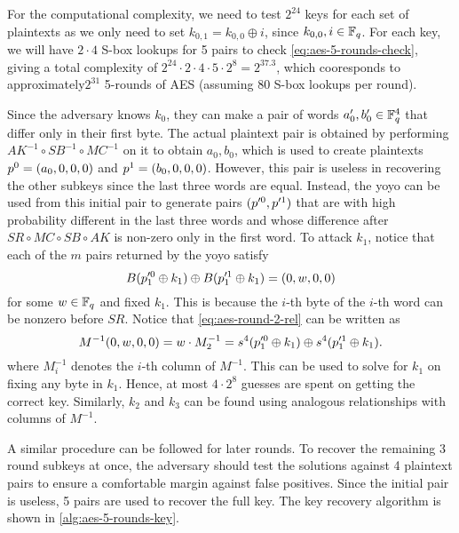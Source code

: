 \documentclass[twoside]{article}
\begin{document}
For the computational complexity, we need to test \(2^{24}\) keys for each set
of plaintexts as we only need to set \(k_{0, 1} = k_{0, 0} \oplus i\), since
\(k_{0, 0}, i \in \mathbb F_q\). For each key, we will have \(2 \cdot 4\) S-box
lookups for 5 pairs to check \eqref{eq:aes-5-rounds-check}, giving a total
complexity of \(2^{24} \cdot 2 \cdot 4 \cdot 5 \cdot 2^8 = 2^{37.3}\), which
cooresponds to approximately\(2^{31}\) 5-rounds of AES (assuming 80 S-box
lookups per round).

Since the adversary knows \(k_0\), they can make a pair of words \(a_0^\prime,
b_0^\prime \in \mathbb F_q^4\) that differ only in their first byte. The actual
plaintext pair is obtained by performing \(AK^{-1} \circ SB^{-1} \circ MC^{-1}\)
on it to obtain \(a_0, b_0\), which is used to create plaintexts \(p^0 =
(a_0, 0, 0, 0)\) and \(p^1 = (b_0, 0, 0, 0)\). However, this pair is
useless in recovering the other subkeys since the last three words are equal.
Instead, the yoyo can be used from this initial pair to generate pairs
\((p^{\prime 0}, p^{\prime 1})\) that are with high probability different
in the last three words and whose difference after \(SR \circ MC \circ SB \circ
AK\) is non-zero only in the first word. To attack \(k_1\), notice that each of
the \(m\) pairs returned by the yoyo satisfy
\begin{equation}
    B(p_1^{\prime 0} \oplus k_1) \oplus B(p_1^{\prime 1} \oplus k_1) = (0, w, 0, 0)
    \label{eq:aes-round-2-rel}
\end{equation}
for some \(w \in \mathbb F_q\) and fixed \(k_1\). This is because the \(i\)-th byte of
the \(i\)-th word can be nonzero before \(SR\). Notice that
\eqref{eq:aes-round-2-rel} can be written as
\begin{equation}
    M^{-1}(0, w, 0, 0) = w \cdot M_2^{-1} = s^4(p_1^{\prime 0} \oplus k_1) \oplus s^4(p_1^{\prime 1} \oplus k_1).
\end{equation}
where \(M_i^{-1}\) denotes the \(i\)-th column of \(M^{-1}\). This can be used
to solve for \(k_1\) on fixing any byte in \(k_1\). Hence, at most \(4 \cdot
2^8\) guesses are spent on getting the correct key. Similarly, \(k_2\) and
\(k_3\) can be found using analogous relationships with columns of \(M^{-1}\).

A similar procedure can be followed for later rounds. To recover the remaining 3
round subkeys at once, the adversary should test the solutions against 4
plaintext pairs to ensure a comfortable margin against false positives. Since
the initial pair is useless, 5 pairs are used to recover the full key. The key
recovery algorithm is shown in \autoref{alg:aes-5-rounds-key}.
\end{document}
